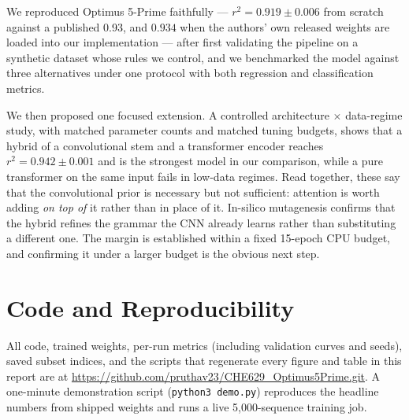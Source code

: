 \documentclass{article}
\newcommand{\repourl}{https://github.com/pruthav23/CHE629_Optimus5Prime.git}
\begin{document}
We reproduced Optimus 5-Prime faithfully --- $r^2 = 0.919 \pm 0.006$ from scratch against a
published 0.93, and $0.934$ when the authors' own released weights are loaded into our
implementation --- after first validating the pipeline on a synthetic dataset whose rules we
control, and we benchmarked the model against three alternatives under one protocol with
both regression and classification metrics.

We then proposed one focused extension. A controlled architecture $\times$ data-regime study,
with matched parameter counts and matched tuning budgets, shows that a hybrid of a
convolutional stem and a transformer encoder reaches $r^2 = 0.942 \pm 0.001$ and is the
strongest model in our comparison, while a pure transformer on the same input fails in
low-data regimes. Read together, these say that the convolutional prior is necessary but not
sufficient: attention is worth adding \emph{on top of} it rather than in place of it.
In-silico mutagenesis confirms that the hybrid refines the grammar the CNN already learns
rather than substituting a different one. The margin is established within a fixed 15-epoch
CPU budget, and confirming it under a larger budget is the obvious next step.

\section*{Code and Reproducibility}
All code, trained weights, per-run metrics (including validation curves and seeds), saved
subset indices, and the scripts that regenerate every figure and table in this report are at
\url{\repourl}. A one-minute demonstration script
(\texttt{python3 demo.py}) reproduces the headline numbers from shipped weights and runs a
live 5{,}000-sequence training job.
\end{document}
